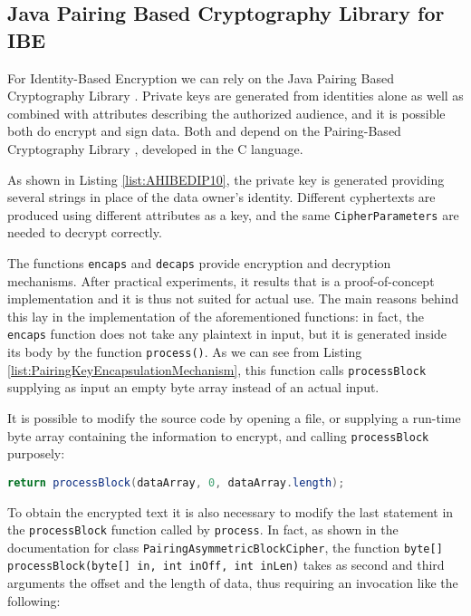 \subsection{Java Pairing Based Cryptography Library for IBE}
For Identity-Based Encryption we can rely on the Java Pairing Based Cryptography Library \cite{ISCC:DecIov11}. Private keys are generated from identities alone as well as combined with attributes describing the authorized audience, and it is possible both do encrypt and sign data. Both \cite{ISCC:DecIov11} and \cite{bethencourt2011library} depend on the Pairing-Based Cryptography Library \cite{PBC2007Lynn}, developed in the C language.



As shown in Listing \ref{list:AHIBEDIP10}, the private key is generated providing several strings in place of the data owner's identity. Different cyphertexts are produced using different attributes as a key, and the same \texttt{CipherParameters} are needed to decrypt correctly.

The functions \texttt{encaps} and \texttt{decaps} provide encryption and decryption mechanisms. After practical experiments, it results that \cite{ISCC:DecIov11} is a proof-of-concept implementation and it is thus not suited for actual use. The main reasons behind this lay in the implementation of the aforementioned functions: in fact, the \texttt{encaps} function does not take any plaintext in input, but it is generated inside its body by the function \texttt{process()}. As we can see from Listing \ref{list:PairingKeyEncapsulationMechanism}, this function calls \texttt{processBlock} supplying as input an empty byte array instead of an actual input.



It is possible to modify the source code by opening a file, or supplying a run-time byte array containing the information to encrypt, and calling \texttt{processBlock} purposely:

\lstinline[language=java]!return processBlock(dataArray, 0, dataArray.length);!

To obtain the encrypted text it is also necessary to modify the last statement in the \texttt{processBlock} function called by \texttt{process}. In fact, as shown in the documentation for class \texttt{PairingAsymmetricBlockCipher}, the function \texttt{byte[] processBlock(byte[] in, int inOff, int inLen)} takes as second and third arguments the offset and the length of data, thus requiring an invocation like the following:

